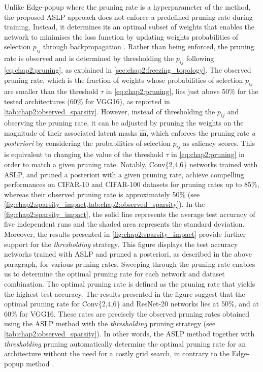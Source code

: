 Unlike Edge-popup \cite{DBLP:conf/cvpr/RamanujanWKFR20} where the pruning rate
is a hyperparameter of the method, the proposed \ac{ASLP} approach does not
enforce a predefined pruning rate during training. Instead, it determines its an
optimal subset of weights that enables the network to minimises the loss
function by updating weights probabilities of selection $p_{ij}$ through
backpropagation \cite{rumelhart1986learning}. Rather than being enforced, the
pruning rate is observed and is determined by thresholding the $p_{ij}$
following \cref{eq:chap2:pruning}, as explained in
\cref{sec:chap2:freezing_topology}. The observed pruning rate, which is the
fraction of weights whose probabilities of selection $p_{ij}$ are smaller than
the threshold $\tau$ in \cref{eq:chap2:pruning}, lies just above 50\% for the
tested architectures (60\% for VGG16), as reported in
\cref{tab:chap2:observed_sparsity}. However, instead of thresholding the
$p_{ij}$ and observing the pruning rate, it can be adjusted by pruning the
weights on the magnitude of their associated latent masks $\bm{\hat{m}}$, which
enforces the pruning rate \emph{a posteriori} by considering the probabilities
of selection $p_{ij}$ as saliency scores. This is equivalent to changing the
value of the threshold $\tau$ in \cref{eq:chap2:pruning} in order to match a
given pruning rate. Notably, Conv\{2,4,6\} networks trained with \ac{ASLP}, and
pruned a posteriori with a given pruning rate, achieve compelling performances
on CIFAR-10 and CIFAR-100 datasets for pruning rates up to 85\%, whereas their
observed pruning rate is approximately 50\% (see
\cref{fig:chap2:sparsity_impact,tab:chap2:observed_sparsity}). In the
\cref{fig:chap2:sparsity_impact}, the solid line represents the average test
accuracy of five independent runs and the shaded area represents the standard
deviation.\\

Moreover, the results presented in \cref{fig:chap2:sparsity_impact} provide
further support for the \textit{thresholding} strategy. This figure displays the
test accuracy networks trained with \ac{ASLP} and pruned a posteriori, as
described in the above paragraph, for various pruning rates. Sweeping through
the pruning rate enables us to determine the optimal pruning rate for each
network and dataset combination. The optimal pruning rate is defined as the
pruning rate that yields the highest test accuracy. The results presented in the
figure suggest that the optimal pruning rate for Conv\{2,4,6\} and ResNet-20
networks lies at 50\%, and at 60\% for VGG16. These rates are precisely the
observed pruning rates obtained using the \ac{ASLP} method with the
\emph{thresholding} pruning strategy (see \cref{tab:chap2:observed_sparsity}).
In other words, the \ac{ASLP} method together with \emph{thresholding} pruning
automatically determine the optimal pruning rate for an architecture without the
need for a costly grid search, in contrary to the Edge-popup method
\cite{DBLP:conf/cvpr/RamanujanWKFR20}.\\

